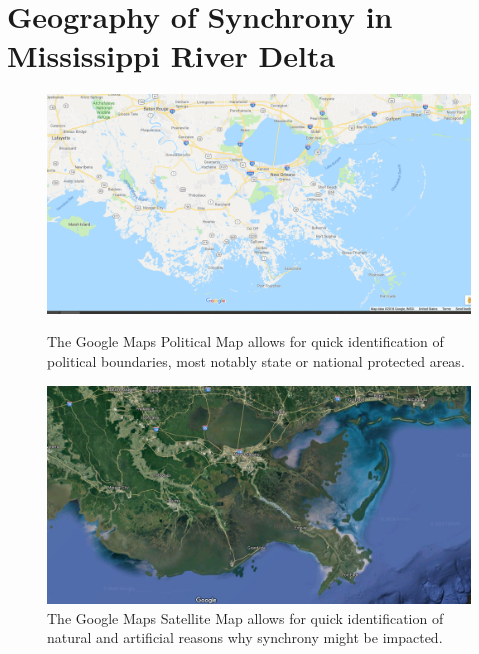 \documentclass[11pt,reqno, twoside]{amsart}
\theoremstyle{plain}  %
\theoremstyle{definition}
\numberwithin{figure}{section}
\numberwithin{equation}{section}
\begin{document}
\section{Geography of Synchrony in Mississippi River Delta}
\begin{figure}[ht] 
  \label{CentralValleyMaps} 
  \begin{minipage}[b]{0.5\linewidth}
    \centering
    \includegraphics[width=.8\linewidth]{images/MississippiDeltaPolitical_Google_2018.png}
    \caption{The Google Maps Political Map allows for quick identification of political boundaries, most notably state or national protected areas.} 
    \vspace{4ex}
  \end{minipage}%
  \begin{minipage}[b]{0.5\linewidth}
    \centering
    \includegraphics[width=.8\linewidth]{images/MississippiDeltaGoogleSatPic_2018.png} 
    \caption{The Google Maps Satellite Map allows for quick identification of natural and artificial reasons why synchrony might be impacted.} 
    \vspace{4ex}
  \end{minipage} 
  \begin{minipage}[b]{0.5\linewidth}
    \centering

\end{minipage}
\end{figure}
\end{document}

